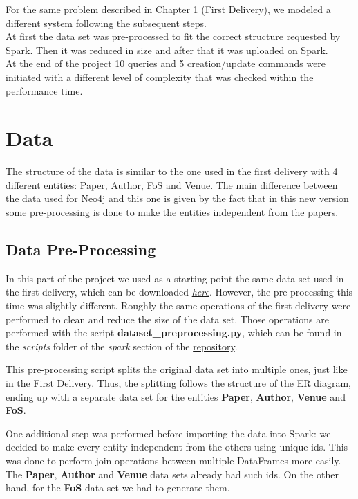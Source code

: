 \documentclass{Configuration_Files/PoliMi3i_thesis}
\begin{document}
For the same problem described in Chapter 1 (First Delivery), we modeled a different system following the subsequent steps.\\
At first the data set was pre-processed to fit the correct structure requested by Spark.
Then it was reduced in size and after that it was uploaded on Spark.\\
At the end of the project 10 queries and 5 creation/update commands were initiated with a different level of complexity that was checked within the performance time.\\

\section{Data}
The structure of the data is similar to the one used in the first delivery with 4 different entities: Paper, Author, FoS and Venue. The main difference between the data used for Neo4j and this one is given by the fact that in this new version some pre-processing is done to make the entities independent from the papers.  \\

\subsection{Data Pre-Processing}
In this part of the project we used as a starting point the same data set used in the first delivery, which can be downloaded \href{https://lfs.AMiner.cn/misc/dblp.v11.zip}{\textit{here}}. 
However, the pre-processing this time was slightly different. 
Roughly the same operations of the first delivery were performed to clean and reduce the size of the data set. Those operations are performed with the script \textbf{dataset\_preprocessing.py}, which can be found in the \textit{scripts} folder of the \textit{spark} section of the \href{https://github.com/albertopirillo/smbud-project-2022}{repository}.

This pre-processing script splits the original data set into multiple ones, just like in the First Delivery. Thus, the splitting follows the structure of the ER diagram, ending up with a separate data set for the entities \textbf{Paper}, \textbf{Author}, \textbf{Venue} and \textbf{FoS}.

One additional step was performed before importing the data into Spark: we decided to make every entity independent from the others using unique ids. This was done to perform join operations between multiple DataFrames more easily. The \textbf{Paper}, \textbf{Author} and \textbf{Venue} data sets already had such ids. On the other hand, for the \textbf{FoS} data set we had to generate them.
\end{document}
